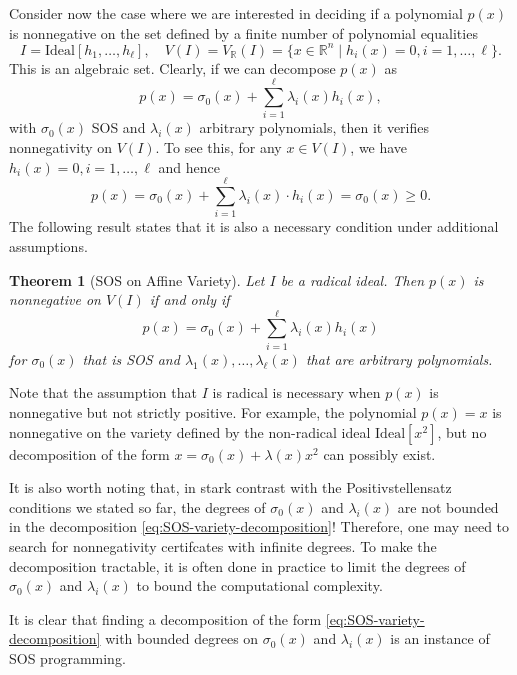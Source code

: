 \documentclass[
]{book}
\newtheorem{theorem}{Theorem}[chapter]
\theoremstyle{definition}
\theoremstyle{definition}
\theoremstyle{definition}
\theoremstyle{definition}
\theoremstyle{remark}
\begin{document}
Consider now the case where we are interested in deciding if a polynomial \(p(x)\) is nonnegative on the set defined by a finite number of polynomial equalities
\[
I = \mathrm{Ideal}[h_1,\dots,h_\ell], \quad V(I) = V_{\mathbb{R}}(I) = \{ x \in \mathbb{R}^{n} \mid h_i(x) = 0, i=1,\dots,\ell \}.
\]
This is an algebraic set. Clearly, if we can decompose \(p(x)\) as
\[
p(x) = \sigma_0(x) + \sum_{i=1}^{\ell} \lambda_i(x) h_i(x),
\]
with \(\sigma_0(x)\) SOS and \(\lambda_i(x)\) arbitrary polynomials, then it verifies nonnegativity on \(V(I)\). To see this, for any \(x \in V(I)\), we have \(h_i(x) = 0,i=1,\dots,\ell\) and hence
\[
p(x) = \sigma_0(x) + \sum_{i=1}^{\ell} \lambda_i(x) \cdot h_i(x) = \sigma_0(x) \geq 0.
\]
The following result states that it is also a necessary condition under additional assumptions.

\begin{theorem}[SOS on Affine Variety]
\protect\hypertarget{thm:SOSonVaritty}{}\label{thm:SOSonVaritty}Let \(I\) be a radical ideal. Then \(p(x)\) is nonnegative on \(V(I)\) if and only if
\begin{equation}
p(x) = \sigma_0(x) + \sum_{i=1}^{\ell} \lambda_i(x) h_i(x)
\label{eq:SOS-variety-decomposition}
\end{equation}
for \(\sigma_0(x)\) that is SOS and \(\lambda_1(x),\dots,\lambda_{\ell}(x)\) that are arbitrary polynomials.
\end{theorem}

Note that the assumption that \(I\) is radical is necessary when \(p(x)\) is nonnegative but not strictly positive. For example, the polynomial \(p(x)=x\) is nonnegative on the variety defined by the non-radical ideal \(\mathrm{Ideal}[x^2]\), but no decomposition of the form \(x = \sigma_0(x) + \lambda(x) x^2\) can possibly exist.

It is also worth noting that, in stark contrast with the Positivstellensatz conditions we stated so far, the degrees of \(\sigma_0(x)\) and \(\lambda_i(x)\) are not bounded in the decomposition \eqref{eq:SOS-variety-decomposition}! Therefore, one may need to search for nonnegativity certifcates with infinite degrees. To make the decomposition tractable, it is often done in practice to limit the degrees of \(\sigma_0(x)\) and \(\lambda_i(x)\) to bound the computational complexity.

It is clear that finding a decomposition of the form \eqref{eq:SOS-variety-decomposition} with bounded degrees on \(\sigma_0(x)\) and \(\lambda_i(x)\) is an instance of SOS programming.
\end{document}
